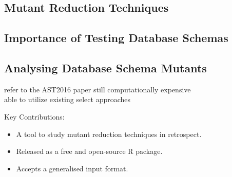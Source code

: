 \subsection{Mutant Reduction Techniques}
%
%
%

\subsection{Importance of Testing Database Schemas}
\subsection{Analysing Database Schema Mutants}
refer to the AST2016 paper
still computationally expensive\\
able to utilize existing select approaches

    Key Contributions:
    \begin{itemize}
        \item A tool to study mutant reduction techniques in retrospect.
        \item Released as a free and open-source R package.
        \item Accepts a generalised input format.
    \end{itemize}
